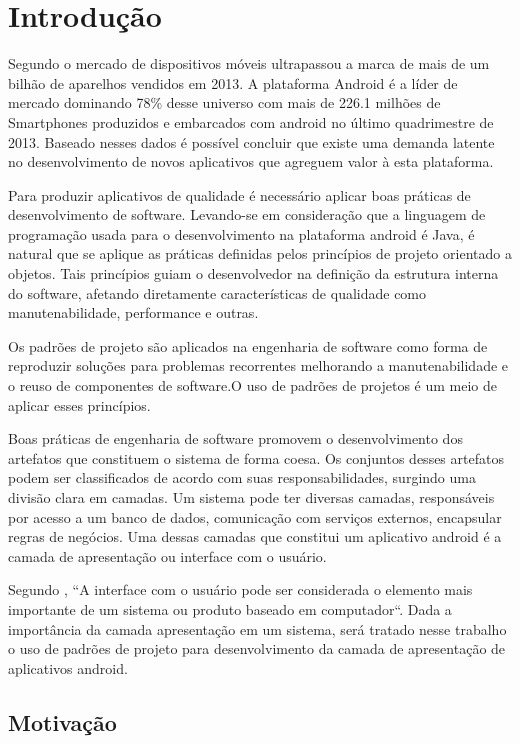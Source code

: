 \chapter{Introdução}

Segundo \cite{idc} o mercado de dispositivos móveis ultrapassou a marca de mais de um
bilhão de aparelhos vendidos em 2013. A plataforma Android é a líder
de mercado dominando 78\% desse universo com mais de 226.1 milhões de
Smartphones produzidos e embarcados com android no último quadrimestre de 2013.
Baseado nesses dados é possível concluir que existe uma demanda latente no
desenvolvimento de novos aplicativos que agreguem valor à esta plataforma.

Para produzir aplicativos de qualidade é necessário aplicar boas práticas de
desenvolvimento de software. Levando-se em consideração que a linguagem de
programação usada para o desenvolvimento na plataforma android é Java, é
natural que se aplique as práticas definidas pelos princípios de projeto
orientado a objetos. Tais  princípios guiam o desenvolvedor na definição da
estrutura interna do software, afetando diretamente características  de
qualidade como manutenabilidade, performance e outras\cite{tempero-di}.

Os padrões de projeto são aplicados na engenharia de software como forma de
reproduzir  soluções  para problemas recorrentes melhorando a manutenabilidade e
o reuso de componentes de software\cite{gof}.O uso de padrões de projetos
é um meio de aplicar esses princípios. 

Boas práticas de engenharia de software promovem o desenvolvimento dos
artefatos que constituem o sistema de forma coesa. Os conjuntos desses artefatos
podem ser classificados de acordo com suas responsabilidades, surgindo
uma divisão clara em camadas. Um sistema pode ter diversas camadas, responsáveis
por acesso a um banco de dados, comunicação com serviços externos, encapsular
regras de negócios. Uma dessas camadas que constitui um aplicativo android é a
camada de apresentação ou interface com o usuário.
 
Segundo , ``A interface com o usuário pode ser considerada
o elemento mais importante de um sistema ou produto baseado em computador``.
Dada a importância da camada apresentação em um sistema, será tratado nesse
trabalho o uso de padrões de projeto para desenvolvimento da camada de
apresentação de aplicativos android.

\section{Motivação}

